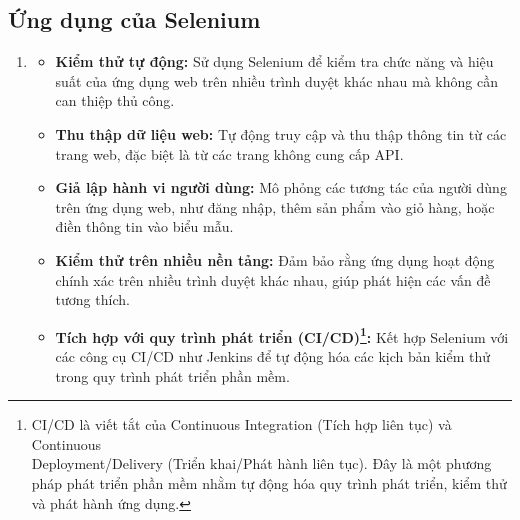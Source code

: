 \subsection{Ứng dụng của Selenium} 
\begin{enumerate}
    \item []
    \begin{itemize}[left=0.5cm] 
        \item[-]\textbf{Kiểm thử tự động:} Sử dụng Selenium để kiểm tra chức năng và hiệu suất của ứng dụng web trên nhiều trình duyệt khác nhau mà không cần can thiệp thủ công.
        
        \item [-]\textbf{Thu thập dữ liệu web:} Tự động truy cập và thu thập thông tin từ các trang web, đặc biệt là từ các trang không cung cấp API.
        
        \item [-]\textbf{Giả lập hành vi người dùng:} Mô phỏng các tương tác của người dùng trên ứng dụng web, như đăng nhập, thêm sản phẩm vào giỏ hàng, hoặc điền thông tin vào biểu mẫu.
        
        \item [-]\textbf{Kiểm thử trên nhiều nền tảng:}  Đảm bảo rằng ứng dụng hoạt động chính xác trên nhiều trình duyệt khác nhau, giúp phát hiện các vấn đề tương thích.
        
        \item [-]\textbf{Tích hợp với quy trình phát triển (CI/CD)\footnote{CI/CD là viết tắt của Continuous Integration (Tích hợp liên tục) và Continuous\\ Deployment/Delivery (Triển khai/Phát hành liên tục). Đây là một phương pháp phát triển phần mềm nhằm tự động hóa quy trình phát triển, kiểm thử và phát hành ứng dụng.}:} Kết hợp Selenium với các công cụ CI/CD như Jenkins để tự động hóa các kịch bản kiểm thử trong quy trình phát triển phần mềm.\cite{noauthor_selenium_nodate_application}
    \end{itemize}
\end{enumerate}
\newpage
